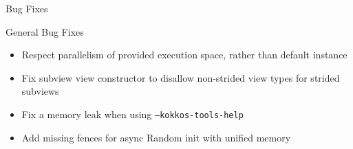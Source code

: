 
\begin{frame}[fragile]

  {\Huge Bug Fixes}

  \vspace{10pt}

\end{frame}





%        



\begin{frame}[fragile]{General Bug Fixes}
    \begin{itemize}
        \item Respect parallelism of provided execution space, rather than default instance %
        \item Fix subview view constructor to disallow non-strided view types for strided subviews %
        \item Fix a memory leak when using \texttt{--kokkos-tools-help} %
        \item Add missing fences for async Random init with unified memory %

    \end{itemize}
\end{frame}

